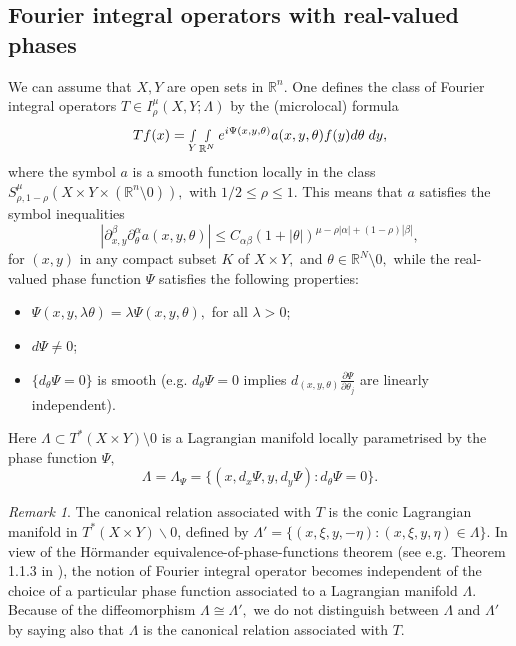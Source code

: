 \documentclass[12pt, reqno]{amsart}
\theoremstyle{definition}
\theoremstyle{remark}
\newtheorem{remark}[theorem]{Remark}
\numberwithin{equation}{section}
\begin{document}
\subsection{Fourier integral operators with real-valued phases}

We can assume that  $X, Y$ are open sets in $\mathbb{R}^n$. One defines the class of
  Fourier integral operators $T\in I^\mu_{\rho}(X, Y;\Lambda)$ by
  the (microlocal) formula
   \begin{equation}\label{EQ:FIO}
     Tf(x)=\smallint\limits_Y\smallint\limits_{\mathbb{R}^N}
   e^{i\Psi(x,y,\theta)} a(x,y,\theta) f(y)d\theta\;dy,
   \end{equation} 
   where the symbol $a$ is a smooth function locally  in the class $S^\mu_{\rho,1-\rho}(X\times Y\times  (\mathbb{R}^n\setminus 0) ),$ with $1/2\leq \rho\leq 1.$ This means that  $a$ satisfies the symbol inequalities
   $$ |\partial_{x,y}^{\beta}\partial_\theta^\alpha
   a(x,y,\theta)|
    \leq C_{\alpha\beta}(1+|\theta|)^{\mu-\rho|\alpha|+(1-\rho)|\beta|},$$
   for $(x,y)$ in any compact subset $K$ of $X\times Y,$ and $\theta \in \mathbb{R}^N\setminus 0,$ while the real-valued phase function $\Psi$ satisfies 
     the following properties:
\begin{itemize}
    \item[1.] $\Psi(x,y,\lambda\theta)=
      \lambda\Psi(x,y,\theta),$ for all $\lambda>0$;
    \item[2.] $d\Psi\not=0$;
    \item[3.] $\{d_\theta\Psi=0\}$ is smooth 
      (e.g. $d_\theta\Psi=0$ implies
      $d_{(x,y,\theta)}\frac{\partial\Psi}{\partial\theta_j}$ are linearly
      independent).
\end{itemize}
Here $\Lambda \subset T^*(X\times Y)\setminus 0$ is a Lagrangian manifold locally parametrised by the phase function $\Psi,$
 $$ \Lambda=\Lambda_\Psi=\{(x,d_x\Psi,y,d_y\Psi): d_\theta\Psi=0\}.$$
\begin{remark}
  The   canonical relation associated with $T$
  is the conic Lagrangian manifold in 
  $T^*(X\times Y)\backslash 0$,  defined by
  $\Lambda'=\{(x,\xi,y,-\eta): (x,\xi,y,\eta)\in \Lambda\}.$
In view of the H\"ormander equivalence-of-phase-functions theorem (see e.g. Theorem 1.1.3 in \cite[Page 9]{Ruzhansky:CWI-book}), the notion of Fourier integral operator becomes independent of the choice of a particular phase function associated to a Lagrangian manifold $\Lambda.$  Because of the diffeomorphism $\Lambda\cong \Lambda',$ we do not distinguish between $\Lambda $ and $\Lambda'$ by saying also that $\Lambda$ is the canonical relation associated with $T.$  
\end{remark}
\end{document}
